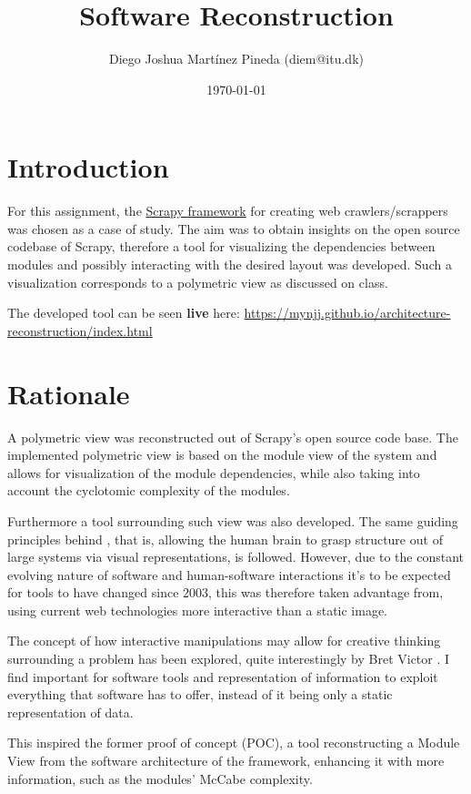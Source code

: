 \documentclass[a4paper,11pt]{article}
\author{Diego Joshua Martínez Pineda (diem@itu.dk)}
\date{\today}
\title{Software Reconstruction}
\begin{document}
\maketitle

\section{Introduction}
\label{sec:orgc794855}

For this assignment, the \href{https://scrapy.org/}{Scrapy framework} for creating web crawlers/scrappers was chosen as a case of study. The aim was to obtain insights on the open source codebase of Scrapy, therefore a tool for visualizing the dependencies between modules and possibly interacting with the desired layout was developed. Such a visualization corresponds to a polymetric view as discussed on class.

The developed tool can be seen \textbf{live} here: \url{https://mynjj.github.io/architecture-reconstruction/index.html}

\section{Rationale}
\label{sec:orgd3dc161}

\label{rationale}
A polymetric view was reconstructed out of Scrapy's open source code base. The implemented polymetric view is based on the module view of the system and allows for visualization of the module dependencies, while also taking into account the cyclotomic complexity of the modules.

Furthermore a tool surrounding such view was also developed. The same guiding principles behind \cite{poly}, that is, allowing the human brain to grasp structure out of large systems via visual representations, is followed. However, due to the constant evolving nature of software and human-software interactions it's to be expected for tools to have changed since 2003, this was therefore taken advantage from, using current web technologies more interactive than a static image.

The concept of how interactive manipulations may allow for creative thinking surrounding a problem has been explored, quite interestingly by Bret Victor \cite{dynamic} \cite{deadfish}. I find important for software tools and representation of information to exploit everything that software has to offer, instead of it being only a static representation of data.

This inspired the former proof of concept (POC), a tool reconstructing a Module View from the software architecture of the framework, enhancing it with more information, such as the modules' McCabe complexity.
\end{document}
